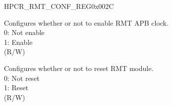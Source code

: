 \begin{register}{H}{PCR\_RMT\_CONF\_REG}{0x002C}\label{regdesc:PCRRMTCONFREG}
%
%
%
\regnewline%
\begin{regdesc}\begin{reglist}
\label{fielddesc:PCRRMTCLKEN}\item [PCR\_RMT\_CLK\_EN] Configures whether or not to enable RMT APB clock.\\
0: Not enable\\
1: Enable\\
(R/W)
\label{fielddesc:PCRRMTRSTEN}\item [PCR\_RMT\_RST\_EN] Configures whether or not to reset RMT module.\\
0: Not reset\\
1: Reset\\ (R/W)
\end{reglist}\end{regdesc}
\end{register}


